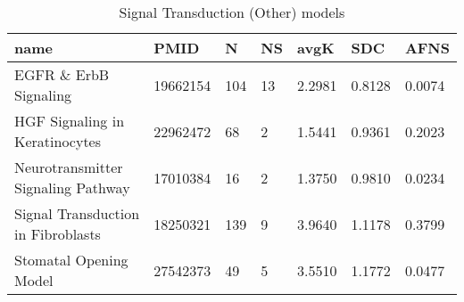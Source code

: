 \begin{table}
\centering
\caption{Signal Transduction (Other) models}
\label{tab:Signal_Transduction_(Other)}
\begin{tabular}{|p{180pt}||p{40pt}|p{25pt}|p{25pt}|p{40pt}|p{25pt}|p{25pt}|}
\toprule
name & PMID & N &NS & avgK &SDC & AFNS \\
\midrule
EGFR \& ErbB Signaling & 19662154 & 104 & 13 & 2.2981 & 0.8128 & 0.0074 \\
HGF Signaling in Keratinocytes & 22962472 &68 & 2 & 1.5441 & 0.9361 & 0.2023 \\
Neurotransmitter Signaling Pathway & 17010384 & 16 & 2 & 1.3750 & 0.9810 & 0.0234 \\
Signal Transduction in Fibroblasts & 18250321 & 139 & 9 & 3.9640 & 1.1178 & 0.3799 \\
Stomatal Opening Model & 27542373 & 49 & 5 & 3.5510 & 1.1772 & 0.0477 \\
\bottomrule
\end{tabular}
\end{table}
